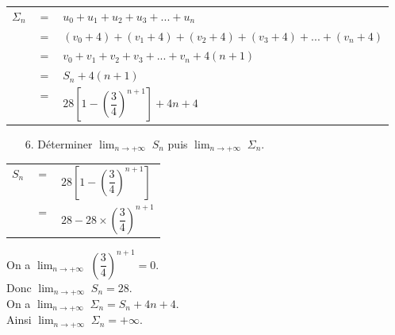 \vspace*{.3cm} 

\begin{tabular}{lll}
$\Sigma_n$ & $=$ & $u_0 + u_1 + u_2 + u_3 + ... + u_n$ \\
& $=$ & $\left(v_0 + 4\right) + \left(v_1 + 4 \right) + \left(v_2 + 4\right) + \left(v_3 + 4\right) + ... + \left(v_n + 4\right)$ \\
& $=$ & $v_0 + v_1 + v_2 + v_3 + ... + v_n + 4\left(n+1\right)$ \\
& $=$ & $S_n + 4\left(n+1\right)$ \vspace*{.1cm} \\
& $=$ & $28\left[1 - \left(\dfrac{3}{4}\right)^{n+1} \right] + 4n + 4$ \vspace*{.3cm} \\
\end{tabular}

\vspace*{.3cm}

\begin{itemize}
\item[6.] Déterminer $ \displaystyle {\lim_{n \rightarrow +\infty}} \; S_n$ puis $ \displaystyle {\lim_{n \rightarrow +\infty}} \; \Sigma_n$. \\
\end{itemize}

\vspace*{.3cm}

\begin{tabular}{lll}
$S_n$ & $=$ & $28\left[1 - \left(\dfrac{3}{4}\right)^{n+1}\right]$ \vspace*{.1cm} \\
& $=$ & $28 - 28 \times \left(\dfrac{3}{4}\right)^{n+1}$ \\
\end{tabular}

\vspace*{.3cm}

On a $ \displaystyle {\lim_{n \rightarrow +\infty}} \; \left(\dfrac{3}{4}\right)^{n+1} = 0$. \\

Donc $ \displaystyle {\lim_{n \rightarrow +\infty}} \; S_n = 28$. \\

On a $ \displaystyle {\lim_{n \rightarrow +\infty}} \; \Sigma_n = S_n + 4n + 4$. \\

Ainsi $ \displaystyle {\lim_{n \rightarrow +\infty}} \; \Sigma_n = +\infty$. 

